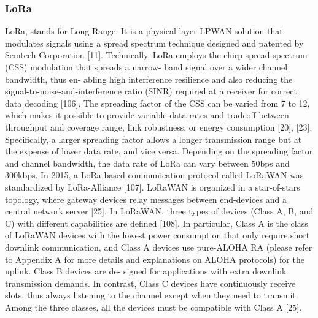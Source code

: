 \documentclass[conference]{IEEEtran}
\begin{document}
\subsubsection{LoRa}
\label{sec:1-2-1}
LoRa, stands for Long Range. It is a physical layer
LPWAN solution that modulates signals using a spread
spectrum technique designed and patented by Semtech
Corporation [11]. Technically, LoRa employs the chirp spread spectrum (CSS) modulation that spreads a narrow-
band signal over a wider channel bandwidth, thus en-
abling high interference resilience and also reducing the
signal-to-noise-and-interference ratio (SINR) required at
a receiver for correct data decoding [106]. The spreading
factor of the CSS can be varied from 7 to 12, which makes
it possible to provide variable data rates and tradeoff
between throughput and coverage range, link robustness,
or energy consumption [20], [23]. Specifically, a larger
spreading factor allows a longer transmission range but at
the expense of lower data rate, and vice versa. Depending
on the spreading factor and channel bandwidth, the data
rate of LoRa can vary between 50bps and 300kbps.
In 2015, a LoRa-based communication protocol called
LoRaWAN was standardized by LoRa-Alliance [107].
LoRaWAN is organized in a star-of-stars topology, where
gateway devices relay messages between end-devices and
a central network server [25]. In LoRaWAN, three types
of devices (Class A, B, and C) with different capabilities
are defined [108]. In particular, Class A is the class of
LoRaWAN devices with the lowest power consumption
that only require short downlink communication, and
Class A devices use pure-ALOHA RA (please refer
to Appendix A for more details and explanations on
ALOHA protocols) for the uplink. Class B devices are de-
signed for applications with extra downlink transmission
demands. In contrast, Class C devices have continuously
receive slots, thus always listening to the channel except
when they need to transmit. Among the three classes, all
the devices must be compatible with Class A [25].
\end{document}
